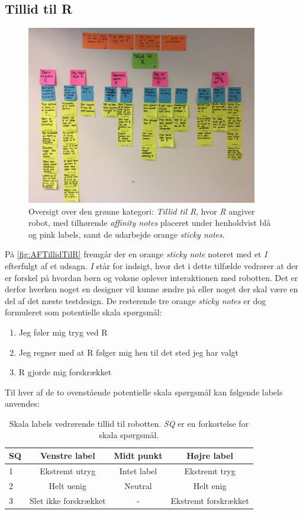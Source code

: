 \subsection*{Tillid til R}
%
\begin{figure}[H]
\centering
\includegraphics[width = 0.9\textwidth]{Figure/AffinityDiagram/TillidTilR} 
\caption{Oversigt over den grønne kategori: \textit{Tillid til R}, hvor \textit{R} angiver robot, med tilhørende \textit{affinity notes} placeret under henholdvist blå og pink labels, samt de udarbejde orange \textit{sticky notes}.}
\label{fig:AFTillidTilR}
\end{figure}
\noindent
%
På \autoref{fig:AFTillidTilR} fremgår der en orange \textit{sticky note} noteret med et \textit{I} efterfulgt af et udsagn. \textit{I} står for indsigt, hvor det i dette tilfælde vedrører at der er forskel på hvordan børn og voksne oplever interaktionen med robotten. Det er derfor hverken noget en designer vil kunne ændre på eller noget der skal være en del af det næste testdesign. De resterende tre orange \textit{sticky notes} er dog formuleret som potentielle skala spørgsmål: \blankline
%
\begin{enumerate}
  \item Jeg føler mig tryg ved R
  \item Jeg regner med at R følger mig hen til det sted jeg har valgt
  \item R gjorde mig forskrækket\blankline
\end{enumerate}
%
Til hver af de to ovenstående potentielle skala spørgsmål kan følgende labels anvendes:
%
\begin{table}[H]
	\centering 
	\begin{tabular}{l|c|c|c}
		SQ  & Venstre label & Midt punkt & Højre label \\\hline
		1   & Ekstremt utryg & Intet label & Ekstremt tryg  \\\hline
		2   & Helt uenig & Neutral & Helt enig \\ \hline
		3   & Slet ikke forskrækket & -  & Ekstremt forskrækket 
	\end{tabular} 
	\caption{Skala labels vedrørende tillid til robotten. \textit{SQ} er en forkortelse for skala spørgsmål.}
	\label{tab:TillidSkala}       
\end{table}
